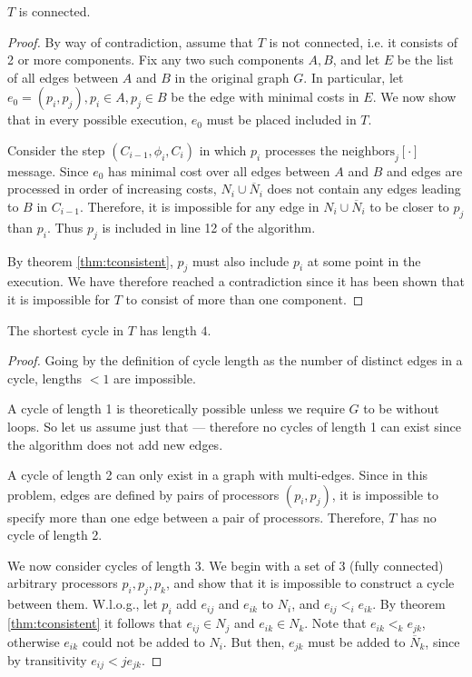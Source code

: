 \begin{theorem}
$T$ is connected.
\end{theorem}

\begin{proof}
By way of contradiction, assume that $T$ is not connected, i.e. it consists of 2
or more components. Fix any two such components $A, B$, and let $E$ be the list
of all edges between $A$ and $B$ in the original graph $G$. In particular, let
$e_0 = (p_i, p_j), p_i \in A, p_j \in B$ be the edge with minimal costs in $E$.
We now show that in every 
possible execution, $e_0$ must be placed included in $T$.

Consider the step $(C_{i-1}, \phi_i, C_i)$ in which $p_i$ processes the 
$\text{neighbors}_j[\cdot]$ message. Since $e_0$ has minimal cost over all edges
between $A$ and $B$ and edges are processed in order of increasing costs,
$N_i \cup \overline{N}_i$ does not contain any edges
leading to $B$ in $C_{i-1}$. Therefore, it is impossible for any edge in 
$N_i \cup \overline{N}_i$ to be closer to $p_j$ than $p_i$. Thus $p_j$
is included in line 12 of the algorithm.

By theorem \ref{thm:tconsistent}, $p_j$ must also include $p_i$ at some point
in the execution. We have therefore reached a contradiction since it has been
shown that it is impossible for $T$ to consist of more than one component.
\end{proof}

\begin{theorem}
The shortest cycle in $T$ has length $4$.
\end{theorem}

\begin{proof}
Going by the definition of cycle length as the number of distinct edges in a
cycle, lengths $< 1$ are impossible.

A cycle of length 1 is theoretically possible unless we require $G$ to be
without loops. So let us assume just that --- therefore no cycles of length
1 can exist since the algorithm does not add new edges.

A cycle of length 2 can only exist in a graph with multi-edges. 
Since in this problem, edges are defined by pairs of processors $(p_i, p_j)$,
it is impossible to specify more than one edge between a pair of processors.
Therefore, $T$ has no cycle of length 2.

We now consider cycles of length 3. We begin with a set of 3 (fully connected)
arbitrary processors
$p_i, p_j, p_k$, and show that it is impossible to construct a cycle between them.
W.l.o.g., let $p_i$ add $e_{ij}$ and $e_{ik}$ to $N_i$, and $e_{ij} <_i e_{ik}$.
By theorem \ref{thm:tconsistent} it follows that $e_{ij} \in N_j$ and $e_{ik}
\in N_k$. Note that $e_{ik} <_k e_{jk}$, otherwise $e_{ik}$ could not be added
to $N_i$. But then, $e_{jk}$ must be added to $\overline{N}_k$, since
by transitivity $e_{ij} <j e_{jk}$.
\end{proof}
